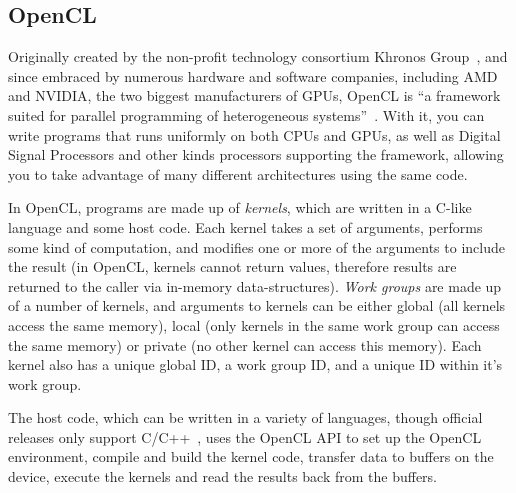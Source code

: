\subsection{OpenCL}

Originally created by the non-profit technology consortium Khronos
Group~\cite{khronos}, and since embraced by numerous hardware and
software companies, including AMD and NVIDIA, the two biggest
manufacturers of GPUs, OpenCL is ``a framework suited for parallel
programming of heterogeneous systems''~\cite{opencl-quote}. With it,
you can write programs that runs uniformly on both CPUs and GPUs, as
well as Digital Signal Processors and other kinds processors
supporting the framework, allowing you to take advantage of many
different architectures using the same code.

In OpenCL, programs are made up of \emph{kernels}, which are written
in a C-like language and some host code. Each kernel takes a set of
arguments, performs some kind of computation, and modifies one or more
of the arguments to include the result (in OpenCL, kernels cannot
return values, therefore results are returned to the caller via
in-memory data-structures). \emph{Work groups} are made up of a number
of kernels, and arguments to kernels can be either global (all kernels
access the same memory), local (only kernels in the same work group
can access the same memory) or private (no other kernel can access
this memory). Each kernel also has a unique global ID, a work group
ID, and a unique ID within it's work group.

The host code, which can be written in a variety of languages, though
official releases only support C/C++~\cite{hostlang}, uses the OpenCL
API to set up the OpenCL environment, compile and build the kernel
code, transfer data to buffers on the device, execute the kernels and
read the results back from the buffers.



